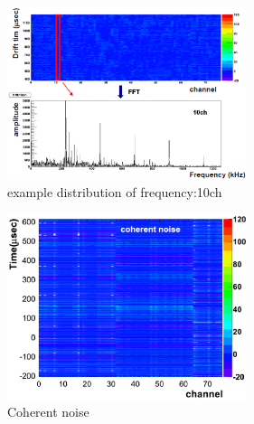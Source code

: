 \begin{figure}[!htb]
  \centering
  \centering
  \includegraphics[width=7cm,clip]{./fig/example10ch.eps}
  \caption{example distribution of frequency:10ch}
  \label{example10ch}
\end{figure}
\begin{figure}[!htb]
  \centering
  \centering
  \includegraphics[width=7cm,clip]{./fig/coherentNoise.eps}
  \caption{Coherent noise}
  \label{coherentNoise}
\end{figure}
